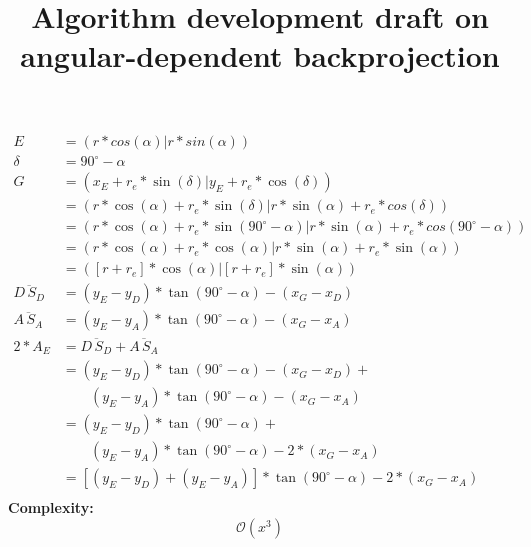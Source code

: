 \documentclass[a4paper,10pt,fleqn]{scrartcl}
\date{}
\title{Algorithm development draft on angular-dependent backprojection}
\begin{document}
\maketitle
\begin{align*}
E &= (r * cos(\alpha) | r * sin(\alpha)) \\
\delta &= 90^\circ - \alpha \\
G &= (x_E + r_e * \sin(\delta) | y_E + r_e * \cos(\delta)) \\
  &= (r * \cos(\alpha) + r_e * \sin(\delta) | r * \sin(\alpha) + r_e * cos(\delta))\\
  &= (r * \cos(\alpha) + r_e * \sin(90^\circ - \alpha) | r * \sin(\alpha) + r_e * cos(90^\circ - \alpha))\\
  &= (r * \cos(\alpha) + r_e * \cos(\alpha) | r * \sin(\alpha) + r_e * \sin(\alpha))\\
  &= ([r + r_e] * \cos(\alpha) | [r + r_e] * \sin(\alpha))\\
\overline{D\,S_D} &= (y_E - y_D) * \tan(90^\circ-\alpha) - (x_G - x_D) \\
\overline{A\,S_A} &= (y_E - y_A) * \tan(90^\circ-\alpha) - (x_G - x_A) \\
2 * A_E &= \overline{D\,S_D} + \overline{A\,S_A} \\ %
  &= (y_E - y_D) * \tan(90^\circ-\alpha) - (x_G - x_D) +\\&\qquad(y_E - y_A) * \tan(90^\circ-\alpha) - (x_G - x_A)\\
  &= (y_E - y_D) * \tan(90^\circ-\alpha) +\\&\qquad(y_E - y_A) * \tan(90^\circ-\alpha) - 2 * (x_G - x_A) \\
  &= [(y_E - y_D) + (y_E - y_A)] * \tan(90^\circ-\alpha) - 2 * (x_G - x_A)\\
\end{align*}
\textbf{Complexity:}
\begin{equation}
\mathcal{O}(x^3)
\end{equation}
\end{document}
